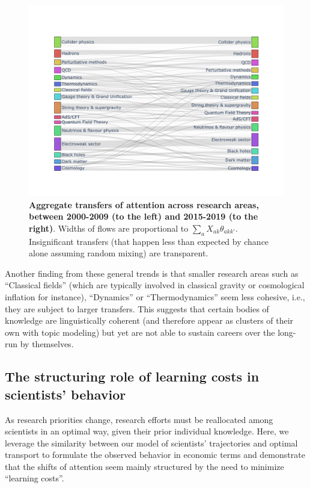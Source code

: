 \documentclass{article}
\begin{document}
 \begin{figure}[h]
     \centering
     \includegraphics[width=\textwidth]{plots/sankey_control.pdf}
     \caption{\textbf{Aggregate transfers of attention across research areas, between 2000-2009 (to the left) and 2015-2019 (to the right)}. Widths of flows are proportional to $\sum_a X_{ak}\theta_{akk'}$. Insignificant transfers (that happen less than expected by chance alone assuming random mixing) are transparent. }
     \label{fig:sankey}
 \end{figure}

Another finding from these general trends is that smaller research areas such as ``Classical fields'' (which are typically involved in classical gravity or cosmological inflation for instance), ``Dynamics'' or ``Thermodynamics'' seem less cohesive, i.e., they are subject to larger transfers. This suggests that certain bodies of knowledge are linguistically coherent (and therefore appear as clusters of their own with topic modeling) but yet are not able to sustain careers over the long-run by themselves.

\subsection{\label{sec:optimal-transport}The structuring role of learning costs in scientists' behavior}

As research priorities change, research efforts must be reallocated among scientists in an optimal way, given their prior individual knowledge. Here, we leverage the similarity between our model of scientists' trajectories and optimal transport \citep{muzellec2017tsallis,li2019learning} to formulate the observed behavior in economic terms and demonstrate that the shifts of attention seem mainly structured by the need to minimize ``learning costs''. 
\end{document}
